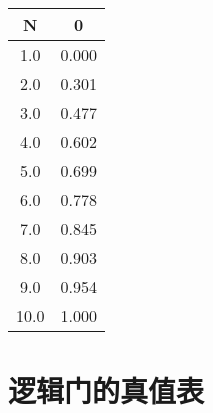 \begin{longtable}[c]{|c|c|}
  \hline
  \textbf{N} & \textbf{0}  \\
  \hline
  \endhead
  \num{1.0}  & \num{.000}  \\ \hline
  \num{2.0}  & \num{.301}  \\ \hline
  \num{3.0}  & \num{.477}  \\ \hline
  \num{4.0}  & \num{.602}  \\ \hline
  \num{5.0}  & \num{.699}  \\ \hline
  \num{6.0}  & \num{.778}  \\ \hline
  \num{7.0}  & \num{.845}  \\ \hline
  \num{8.0}  & \num{.903}  \\ \hline
  \num{9.0}  & \num{.954}  \\ \hline
  \num{10.0} & \num{1.000} \\ \hline
\end{longtable}

\newpage

\section{逻辑门的真值表}


